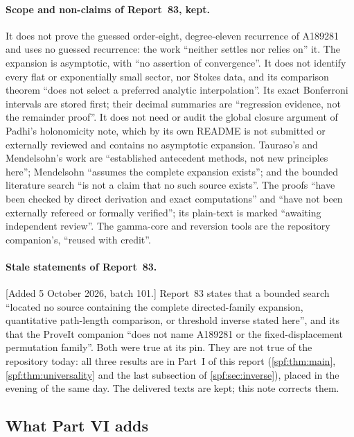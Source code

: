 \documentclass[11pt]{article}
\numberwithin{equation}{section}
\theoremstyle{definition}
\theoremstyle{remark}
\theoremstyle{definition}
\begin{document}
\paragraph{Scope and non-claims of Report~83, kept.}
It does not prove the guessed order-eight, degree-eleven recurrence of
A189281 and uses no guessed recurrence: the work ``neither settles nor
relies on'' it. The expansion is asymptotic, with ``no assertion of
convergence''. It does not identify every flat or exponentially small
sector, nor Stokes data, and its comparison theorem ``does not select a
preferred analytic interpolation''. Its exact Bonferroni intervals are
stored first; their decimal summaries are ``regression evidence, not the
remainder proof''. It does not need or audit the global closure argument of
Padhi's holonomicity note, which by its own README is not submitted or
externally reviewed and contains no asymptotic expansion. Tauraso's and
Mendelsohn's work are ``established antecedent methods, not new principles
here''; Mendelsohn ``assumes the complete expansion exists''; and the
bounded literature search ``is not a claim that no such source exists''.
The proofs ``have been checked by direct derivation and exact
computations'' and ``have not been externally refereed or formally
verified''; its plain-text  is marked
``awaiting independent review''. The gamma-core and reversion tools are the
repository companion's, ``reused with credit''.

\paragraph{Stale statements of Report~83.}
[Added 5 October 2026, batch 101.] Report~83 states that a bounded search
``located no source containing the complete directed-family expansion,
quantitative path-length comparison, or threshold inverse stated here'',
and its  that the ProveIt companion
``does not name A189281 or the fixed-displacement permutation family''.
Both were true at its pin. They are not true of the repository today: all
three results are in Part~I of this report (\cref{spf:thm:main},
\cref{spf:thm:universality} and the last subsection of
\cref{spf:sec:inverse}), placed in the evening of the same day. The
delivered texts are kept; this note corrects them.

\subsection{What Part VI adds}
\label{spf:fd:sec:claims}
\end{document}
